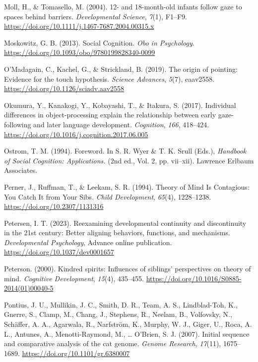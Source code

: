 \documentclass[
]{scrbook}
\newlength{\cslhangindent}
\newenvironment{CSLReferences}[2] %
 {\begin{list}{}{%
  \setlength{\itemindent}{0pt}
  \setlength{\leftmargin}{0pt}
  \setlength{\parsep}{0pt}
  \ifodd #1
   \setlength{\leftmargin}{\cslhangindent}
   \setlength{\itemindent}{-1\cslhangindent}
  \fi
  \setlength{\itemsep}{#2\baselineskip}}}
 {\end{list}}
\begin{document}
\begin{CSLReferences}{1}{0}
Moll, H., \& Tomasello, M. (2004). 12- and 18-month-old infants follow gaze to spaces behind barriers. \emph{Developmental Science}, \emph{7}(1), F1--F9. \url{https://doi.org/10.1111/j.1467-7687.2004.00315.x}

Moskowitz, G. B. (2013). Social {Cognition}. \emph{Obo in Psychology}. \url{https://doi.org/10.1093/obo/9780199828340-0099}

O'Madagain, C., Kachel, G., \& Strickland, B. (2019). The origin of pointing: {Evidence} for the touch hypothesis. \emph{Science Advances}, \emph{5}(7), eaav2558. \url{https://doi.org/10.1126/sciadv.aav2558}

Okumura, Y., Kanakogi, Y., Kobayashi, T., \& Itakura, S. (2017). Individual differences in object-processing explain the relationship between early gaze-following and later language development. \emph{Cognition}, \emph{166}, 418--424. \url{https://doi.org/10.1016/j.cognition.2017.06.005}

Ostrom, T. M. (1994). Foreword. In S. R. Wyer \& T. K. Srull (Eds.), \emph{Handbook of {Social Cognition}: {Applications}.} (2nd ed., Vol. 2, pp. vii--xii). Lawrence Erlbaum Associates.

Perner, J., Ruffman, T., \& Leekam, S. R. (1994). Theory of {Mind Is Contagious}: {You Catch It} from {Your Sibs}. \emph{Child Development}, \emph{65}(4), 1228--1238. \url{https://doi.org/10.2307/1131316}

Petersen, I. T. (2023). Reexamining developmental continuity and discontinuity in the 21st century: {Better} aligning behaviors, functions, and mechanisms. \emph{Developmental Psychology}, Advance online publication. \url{https://doi.org/10.1037/dev0001657}

Peterson. (2000). Kindred spirits: {Influences} of siblings' perspectives on theory of mind. \emph{Cognitive Development}, \emph{15}(4), 435--455. \url{https://doi.org/10.1016/S0885-2014(01)00040-5}

Pontius, J. U., Mullikin, J. C., Smith, D. R., Team, A. S., Lindblad-Toh, K., Gnerre, S., Clamp, M., Chang, J., Stephens, R., Neelam, B., Volfovsky, N., Schäffer, A. A., Agarwala, R., Narfström, K., Murphy, W. J., Giger, U., Roca, A. L., Antunes, A., Menotti-Raymond, M., \ldots{} O'Brien, S. J. (2007). Initial sequence and comparative analysis of the cat genome. \emph{Genome Research}, \emph{17}(11), 1675--1689. \url{https://doi.org/10.1101/gr.6380007}


\end{CSLReferences}
\end{document}

